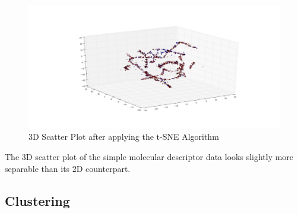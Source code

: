 \documentclass[a4paper,12pt]{report}
\begin{document}
		\begin{figure}[H]
			\centering
			\includegraphics[width=\textwidth,scale=1,totalheight=0.5\textheight]{images/scatter_tsne_3D}
			\caption{3D Scatter Plot after applying the t-SNE Algorithm}
			\label{fig:scatter_tsne_3D}
		\end{figure}
		The 3D scatter plot of the simple molecular descriptor data looks slightly more separable than its 2D counterpart.
		
		
		
		
		
		
		
		\subsection{Clustering}
\end{document}
